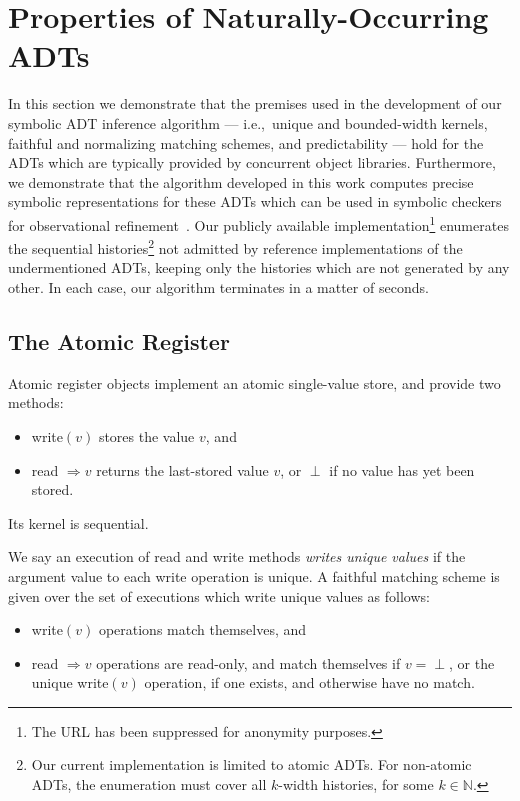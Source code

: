 \section{Properties of Naturally-Occurring ADTs}
\label{sec:nature}

In this section we demonstrate that the premises used in the development of our
symbolic ADT inference algorithm — i.e.,~unique and bounded-width kernels,
faithful and normalizing matching schemes, and predictability — hold for the
ADTs which are typically provided by concurrent object libraries. Furthermore,
we demonstrate that the algorithm developed in this work computes precise
symbolic representations for these ADTs which can be used in symbolic checkers
for observational refinement~\cite{conf/pldi/EmmiEH15}. Our publicly available
implementation\footnote{The URL has been suppressed for anonymity purposes.}
enumerates the sequential histories\footnote{Our current implementation is
limited to atomic ADTs. For non-atomic ADTs, the enumeration must cover all
$k$-width histories, for some $k \in \mathbb{N}$.} not admitted by reference
implementations of the undermentioned ADTs, keeping only the histories which
are not generated by any other. In each case, our algorithm terminates in a
matter of seconds.

\subsection{The Atomic Register}

Atomic register objects implement an atomic single-value store, and provide two
methods:
\begin{itemize}

  \item write$(v)$ stores the value $v$, and

  \item read $\Rightarrow v$ returns the last-stored value $v$, or $\perp$
  if no value has yet been stored.

\end{itemize}
Its kernel is sequential.

We say an execution of read and write methods \emph{writes unique values} if
the argument value to each write operation is unique. A faithful matching
scheme is given over the set of executions which write unique values as follows:
\begin{itemize}

  \item write$(v)$ operations match themselves, and

  \item read $\Rightarrow v$ operations are read-only, and match themselves if
  $v = \perp$, or the unique write$(v)$ operation, if one exists, and otherwise 
  have no match.

\end{itemize}

